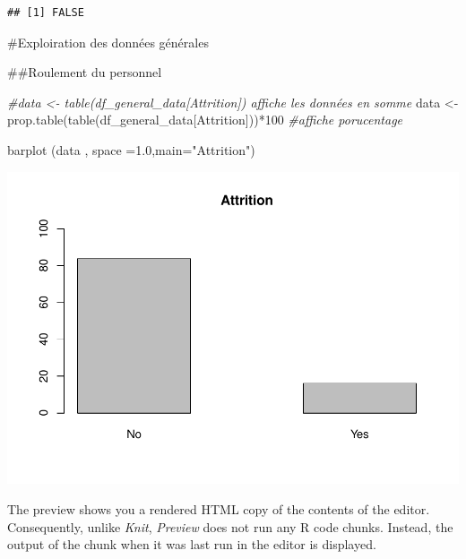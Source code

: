 \documentclass[
]{article}
\newenvironment{Shaded}{\begin{snugshade}}{\end{snugshade}}
\newcommand{\AttributeTok}[1]{\textcolor[rgb]{0.77,0.63,0.00}{#1}}
\newcommand{\CommentTok}[1]{\textcolor[rgb]{0.56,0.35,0.01}{\textit{#1}}}
\newcommand{\DecValTok}[1]{\textcolor[rgb]{0.00,0.00,0.81}{#1}}
\newcommand{\FloatTok}[1]{\textcolor[rgb]{0.00,0.00,0.81}{#1}}
\newcommand{\FunctionTok}[1]{\textcolor[rgb]{0.00,0.00,0.00}{#1}}
\newcommand{\NormalTok}[1]{#1}
\newcommand{\OtherTok}[1]{\textcolor[rgb]{0.56,0.35,0.01}{#1}}
\newcommand{\SpecialCharTok}[1]{\textcolor[rgb]{0.00,0.00,0.00}{#1}}
\newcommand{\StringTok}[1]{\textcolor[rgb]{0.31,0.60,0.02}{#1}}
\begin{document}
\begin{verbatim}
## [1] FALSE
\end{verbatim}

\#Exploiration des données générales

\#\#Roulement du personnel

\begin{Shaded}
\begin{Highlighting}[]
\CommentTok{\#data \textless{}{-} table(df\_general\_data[\textquotesingle{}Attrition\textquotesingle{}])   affiche les données en somme }
\NormalTok{data }\OtherTok{\textless{}{-}} \FunctionTok{prop.table}\NormalTok{(}\FunctionTok{table}\NormalTok{(df\_general\_data[}\StringTok{\textquotesingle{}Attrition\textquotesingle{}}\NormalTok{]))}\SpecialCharTok{*}\DecValTok{100}   \CommentTok{\#affiche porucentage }


\FunctionTok{barplot}\NormalTok{ (data , }\AttributeTok{space =}\FloatTok{1.0}\NormalTok{,}\AttributeTok{main=}\StringTok{"Attrition"}\NormalTok{)}
\end{Highlighting}
\end{Shaded}

\includegraphics{Projet_files/figure-latex/unnamed-chunk-9-1.pdf}

The preview shows you a rendered HTML copy of the contents of the
editor. Consequently, unlike \emph{Knit}, \emph{Preview} does not run
any R code chunks. Instead, the output of the chunk when it was last run
in the editor is displayed.
\end{document}
